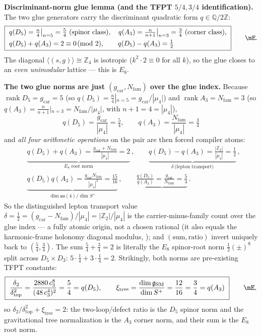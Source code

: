 \documentclass[11pt,a4paper]{article}
\newcommand{\gcar}{g_{\mathrm{car}}}
\newcommand{\Nfam}{N_{\mathrm{fam}}}
\newcommand{\cthree}{c_3}
\newcommand{\dtop}{\delta_{\mathrm{top}}}
\newcommand{\dtwo}{\delta_2}
\newcommand{\dimg}{\dim\mathfrak g_{\mathrm{SM}}}
\newcommand{\Z}{\mathbb{Z}}
\theoremstyle{definition}
\begin{document}
\noindent\textbf{Discriminant-norm glue lemma (and the TFPT $5/4,3/4$ identification).} The two glue
generators carry the discriminant quadratic form $q\in\mathbb Q/2\mathbb Z$:
\begin{equation}
  \boxed{\ \begin{aligned}
    &q(D_5)=\tfrac{n}{4}\big|_{n=5}=\tfrac54\ (\text{spinor class}),\quad
    q(A_3)=\tfrac{n}{n+1}\big|_{n=3}=\tfrac34\ (\text{corner class}),\\
    &q(D_5)+q(A_3)=2\equiv0\!\!\pmod 2,\qquad q(D_5)-q(A_3)=\tfrac12
  \end{aligned}\ }\qquad\mE .
\end{equation}
The diagonal $\langle(s,g)\rangle\cong\mathbb Z_4$ is isotropic ($k^2\cdot2\equiv0$ for all $k$), so the
glue closes to an \emph{even unimodular} lattice --- this is $E_8$.

\textbf{The two glue norms are just $(\gcar,\Nfam)$ over the glue index.} Because $\operatorname{rank}D_5=\gcar=5$
(so $q(D_5)=\tfrac n4|_{n=5}=\gcar/|\mu_4|$) and $\operatorname{rank}A_3=\Nfam=3$
(so $q(A_3)=\tfrac{n}{n+1}|_{n=3}=\Nfam/|\mu_4|$, with $n{+}1=4=|\mu_4|$),
\[
  \boxed{\ q(D_5)=\frac{\gcar}{|\mu_4|}=\tfrac54,\qquad q(A_3)=\frac{\Nfam}{|\mu_4|}=\tfrac34\ }
\]
and \emph{all four arithmetic operations} on the pair are then forced compiler atoms:
\[
  \begin{aligned}
  &\underbrace{q(D_5){+}q(A_3)=\tfrac{\gcar+\Nfam}{|\mu_4|}=2}_{\text{$E_8$ root norm}}\,,\qquad
  \underbrace{q(D_5){-}q(A_3)=\tfrac{|\Z_2|}{|\mu_4|}=\tfrac12}_{\delta\ \text{(lepton transport)}}\,,\\[4pt]
  &\underbrace{q(D_5)q(A_3)=\tfrac{\gcar\Nfam}{|\mu_4|^2}=\tfrac{15}{16}}_{\dim\mathfrak{su}(4)/\dim S^+}\,,\qquad
  \underbrace{\tfrac{q(D_5)}{q(A_3)}=\tfrac{\gcar}{\Nfam}=\tfrac53}_{}\,.
  \end{aligned}
\]
So the distinguished lepton transport value $\delta=\tfrac12=(\gcar-\Nfam)/|\mu_4|=|\Z_2|/|\mu_4|$ is the
carrier-minus-family count over the glue index --- a fully atomic origin, not a chosen rational (it also
equals the harmonic-frame holonomy diagonal modulus, ); and $(\text{sum},\text{ratio})$
invert uniquely back to $(\tfrac54,\tfrac34)$.  The sum $\tfrac54+\tfrac34=2$ is
literally the $E_8$ spinor-root norm $\tfrac12(\pm)^8$ split across $D_5\times D_3$:
$5\cdot\tfrac14+3\cdot\tfrac14=2$. Strikingly, both norms are pre-existing TFPT constants:
\begin{equation}
  \boxed{\ \frac{\dtwo}{\dtop^2}=\frac{2880\,\cthree^8}{(48\,\cthree^4)^2}=\frac54=q(D_5),\qquad
  \xi_{\mathrm{tree}}=\frac{\dimg}{\dim S^+}=\frac{12}{16}=\frac34=q(A_3)\ }\qquad\mE ,
\end{equation}
so $\dtwo/\dtop^2+\xi_{\mathrm{tree}}=2$: the two-loop/defect ratio is the $D_5$ spinor norm and the
gravitational tree normalization is the $A_3$ corner norm, and their sum is the $E_8$ root norm.
\end{document}
